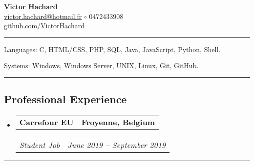 \documentclass[10pt,letterpaper]{article}
\makeatletter
\newenvironment{indentsection}[1]
{\begin{list}{}
  {\setlength{\leftmargin}{#1}} \item[]
}
{\end{list}}
\newcommand{\headerrow}[2]
{\begin{tabular*}{\linewidth}{l@{\extracolsep{\fill}}r}
  #1 &
  #2 \\
\end{tabular*}}
\makeatother
\begin{document}
\begin{center}
  \huge \textbf{Victor Hachard} \\
  \large
  \href{mailto:victor.hachard@hotmail.fr}{victor.hachard@hotmail.fr}
  $\circ$
  0472433908
  \\
  \href{http://www.github.com/VictorHachard}{github.com/VictorHachard}
  \vspace{-0.2em}
\end{center}


\hrule
\begin{indentsection}{\parindent}
\begin{description*}
  \item[Languages:] C, HTML/CSS, PHP, SQL, Java, JavaScript, Python, Shell.
  \item[Systems:] Windows, Windows Server, UNIX, Linux, Git, GitHub.
\end{description*}
\end{indentsection}


\hrule
\vspace{-0.4em}
\subsection*{Professional Experience}
\begin{itemize}
  \parskip=0.1em

  \item
  \headerrow
    {\textbf{Carrefour EU}}
    {\textbf{Froyenne, Belgium}}
  \headerrow
    {\emph{Student Job}}
    {\emph{June 2019 -- September 2019}}
  \end{itemize}


\hrule
\vspace{-0.4em}
\end{document}
